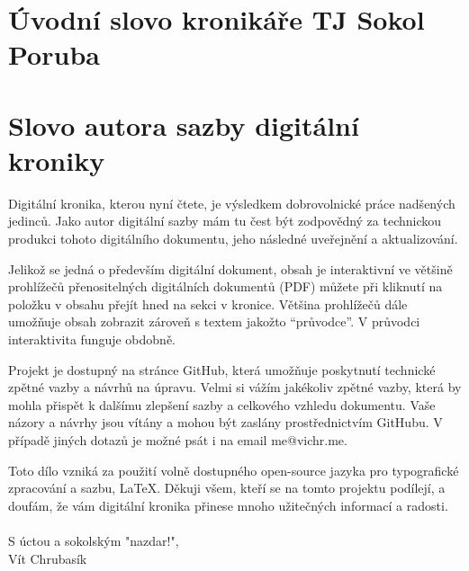 \documentclass[openany]{report}
\begin{document}
\tableofcontents
\restoregeometry



\section{Úvodní slovo kronikáře TJ Sokol Poruba}




\section{Slovo autora sazby digitální kroniky}

Digitální kronika, kterou nyní čtete, je výsledkem dobrovolnické práce nadšených jedinců. Jako autor digitální sazby mám tu čest být zodpovědný za technickou produkci tohoto digitálního dokumentu, jeho následné uveřejnění a aktualizování.

Jelikož se jedná o především digitální dokument, obsah je interaktivní ve většině prohlížečů přenositelných digitálních dokumentů (PDF) můžete při kliknutí na položku v obsahu přejít hned na sekci v kronice. Většina prohlížečů dále umožňuje obsah zobrazit zároveň s textem jakožto \enquote{průvodce}. V průvodci interaktivita funguje obdobně.

Projekt je dostupný na stránce GitHub, která umožňuje poskytnutí technické zpětné vazby a návrhů na úpravu. Velmi si vážím jakékoliv zpětné vazby, která by mohla přispět k dalšímu zlepšení sazby a celkového vzhledu dokumentu. Vaše názory a návrhy jsou vítány a mohou být zaslány prostřednictvím GitHubu. V případě jiných dotazů je možné psát i na email me@vichr.me.

Toto dílo vzniká za použití volně dostupného open-source jazyka pro typografické zpracování a sazbu, \LaTeX. Děkuji všem, kteří se na tomto projektu podílejí, a doufám, že vám digitální kronika přinese mnoho užitečných informací a radosti.\\\\
S úctou a sokolským "nazdar!",\\
Vít Chrubasík
\restoregeometry
\end{document}
